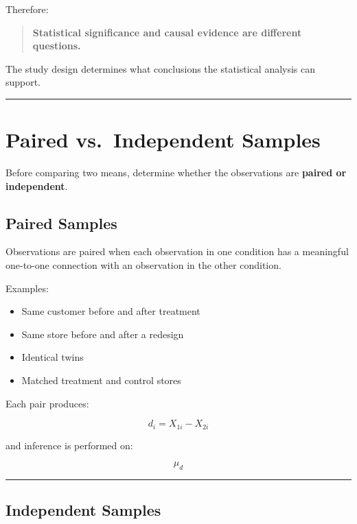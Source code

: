 \documentclass[
  letterpaper,
  DIV=11,
  numbers=noendperiod]{scrreprt}
\providecommand{\tightlist}{%
  \setlength{\itemsep}{0pt}\setlength{\parskip}{0pt}}
\begin{document}
Therefore:

\begin{quote}
\textbf{Statistical significance and causal evidence are different
questions.}
\end{quote}

The study design determines what conclusions the statistical analysis
can support.

\begin{center}\rule{0.5\linewidth}{0.5pt}\end{center}


\chapter{Paired vs.~Independent
Samples}\label{paired-vs.-independent-samples-1}

Before comparing two means, determine whether the observations are
\textbf{paired or independent}.

\section{Paired Samples}\label{paired-samples}

Observations are paired when each observation in one condition has a
meaningful one-to-one connection with an observation in the other
condition.

Examples:

\begin{itemize}
\tightlist
\item
  Same customer before and after treatment
\item
  Same store before and after a redesign
\item
  Identical twins
\item
  Matched treatment and control stores
\end{itemize}

Each pair produces:

\[
d_i=X_{1i}-X_{2i}
\]

and inference is performed on:

\[
\mu_d
\]

\begin{center}\rule{0.5\linewidth}{0.5pt}\end{center}

\section{Independent Samples}\label{independent-samples}
\end{document}
